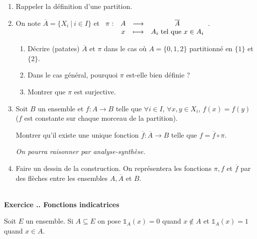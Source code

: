 \documentclass{article}
\newcommand{\fonction}[5]{\raisebox{-0.5\baselineskip}{$\begin{array}{lccc}
    #1: & #2 & \longrightarrow & #3 \\
        & #4 & \longmapsto & #5 \end{array}$}}
\newcounter{exo}
\newcommand{\exercice}[1][\null]{\textbf{\\ \large Exercice \thesection.\theexo. \normalsize #1} \addtocounter{exo}{1}}
\begin{document}
\begin{enumerate}

\item Rappeler la définition d'une partition.

\item On note $\overline{A} = \{X_i~|~i \in I\}$ et $\fonction{\pi}{A}{\overline{A}}{x}{A_i \text{ tel que } x \in A_i}$.

\begin{enumerate}

\item Décrire (patates) $\overline{A}$ et $\pi$ dans le cas où $A = \{0,1,2\}$ partitionné en $\{1\}$ et $\{2\}$.

\item Dans le cas général, pourquoi $\pi$ est-elle bien définie ?

\item Montrer que $\pi$ est surjective.

\end{enumerate}

\item Soit $B$ un ensemble et $f : A\rightarrow B$ telle que $\forall i \in I$, $\forall x, y \in X_i$, $f(x) = f(y)$ ($f$ est constante sur chaque morceau de la partition).

Montrer qu'il existe une unique fonction $\overline{f} : \overline{A} \rightarrow B$ telle que $f = \overline{f} \circ \pi$.

\emph{On pourra raisonner par analyse-synthèse.}

\item Faire un dessin de la construction. On représentera les fonctions $\pi, f$ et $ \overline{f}$ par des flèches entre les ensembles $A, \overline{A}$ et $B$.
\end{enumerate}


\exercice[Fonctions indicatrices]

Soit $E$ un ensemble. Si $A \subseteq E$ on pose 
$\mathds{1}_A (x) = 0$ quand $x \not \in A$ et $\mathds{1}_A (x) = 1$ 
quand $x \in A$.
\end{document}
